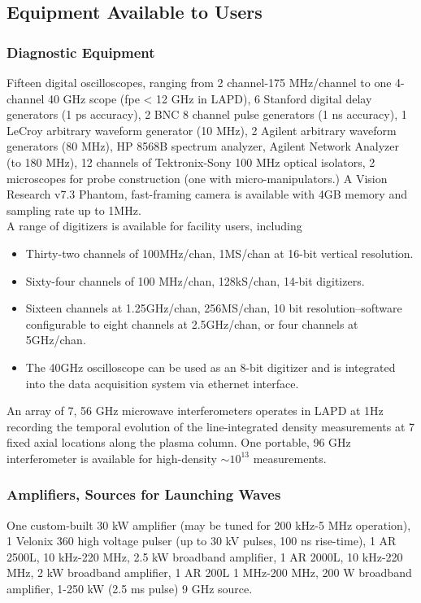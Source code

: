 \documentclass[11pt]{article}
\begin{document}
\pagebreak
\subsection{Equipment Available to Users}

\subsubsection{Diagnostic Equipment}
Fifteen digital oscilloscopes, ranging from 2 channel-175 MHz/channel to one 4-channel 40 GHz scope (fpe < 12 GHz in LAPD), 6 Stanford digital delay generators (1 ps accuracy), 2 BNC 8 channel pulse generators (1 ns accuracy), 1 LeCroy arbitrary waveform generator (10 MHz), 2 Agilent arbitrary waveform generators (80 MHz), HP 8568B spectrum analyzer, Agilent Network Analyzer (to 180 MHz), 12 channels of Tektronix-Sony 100 MHz optical isolators, 2 microscopes for probe construction (one with micro-manipulators.) A Vision Research v7.3 Phantom, fast-framing camera is available with 4GB memory and sampling rate up to 1MHz.\\
	A range of digitizers is available for facility users, including
\begin{itemize}
\item Thirty-two channels of 100MHz/chan, 1MS/chan at 16-bit vertical resolution.
\item Sixty-four  channels of 100 MHz/chan, 128kS/chan, 14-bit digitizers.
\item Sixteen channels at 1.25GHz/chan, 256MS/chan, 10 bit resolution--software configurable  to eight channels at 2.5GHz/chan, or four channels at 5GHz/chan.

\item The 40GHz oscilloscope can be used as an 8-bit digitizer and is integrated into the data acquisition system via ethernet interface.
\end{itemize}
	An array of 7, 56 GHz microwave interferometers operates in LAPD at 1Hz recording the temporal evolution of the line-integrated density measurements at 7 fixed axial locations along the plasma column. One portable, 96 GHz interferometer is available for high-density $ \sim 10^{13}$ measurements.

\subsubsection{Amplifiers, Sources for Launching Waves}
One custom-built 30 kW amplifier (may be tuned for 200 kHz-5 MHz operation), 1 Velonix 360 high voltage pulser (up to 30 kV pulses, 100 ns rise-time), 1 AR 2500L, 10 kHz-220 MHz, 2.5 kW broadband amplifier, 1 AR 2000L, 10 kHz-220 MHz, 2 kW broadband amplifier, 1 AR 200L 1 MHz-200 MHz, 200 W broadband amplifier, 1-250 kW (2.5 ms pulse) 9 GHz source.
\end{document}
